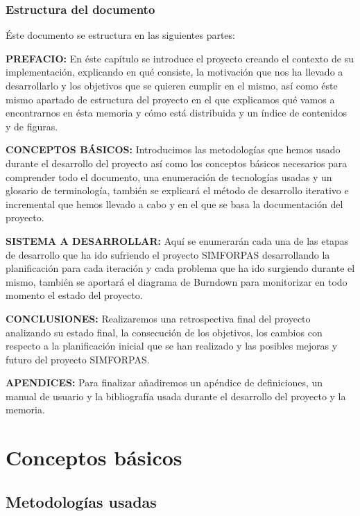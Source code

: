 \documentclass[12pt,a4paper,spanish]{book} %
\begin{document}
\newpage
\section{Estructura del documento}

Éste documento se estructura en las siguientes partes:

\textbf{PREFACIO:} En éste capítulo se introduce el proyecto creando el contexto de su implementación, explicando en qué consiste, la motivación que nos ha llevado a desarrollarlo y los objetivos que se quieren cumplir en el mismo, así como éste mismo apartado de estructura del proyecto en el que explicamos qué vamos a encontrarnos en ésta memoria y cómo está distribuida y un índice de contenidos y de figuras.

\textbf{CONCEPTOS BÁSICOS:} Introducimos las metodologías que hemos usado durante el desarrollo del proyecto así como los conceptos básicos necesarios para comprender todo el documento, una enumeración de tecnologías usadas y un glosario de terminología, también se explicará el método de desarrollo iterativo e incremental que hemos llevado a cabo y en el que se basa la documentación del proyecto.

\textbf{SISTEMA A DESARROLLAR:} Aquí se enumerarán cada una de las etapas de desarrollo que ha ido sufriendo el proyecto SIMFORPAS desarrollando la planificación para cada iteración y cada problema que ha ido surgiendo durante el mismo, también se aportará el diagrama de Burndown para monitorizar en todo momento el estado del proyecto.

\textbf{CONCLUSIONES:} Realizaremos una retrospectiva final del proyecto analizando su estado final, la consecución de los objetivos, los cambios con respecto a la planificación inicial que se han realizado y las posibles mejoras y futuro del proyecto SIMFORPAS.

\textbf{APENDICES:} Para finalizar añadiremos un apéndice de definiciones, un manual de usuario y la bibliografía usada durante el desarrollo del proyecto y la memoria.

\newpage
\ClearShipoutPicture
\part{Conceptos básicos}
\chapter{Metodologías usadas}
\end{document}
